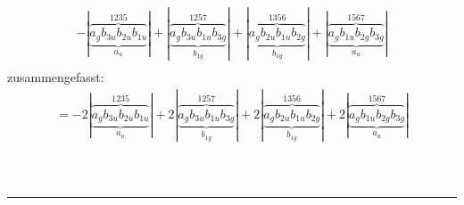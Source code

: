 \documentclass{article}
\begin{document}
\begin{multline*}
-\left|\underbrace{\overbrace{a_{g} b_{3u} b_{2u} b_{1u}}^{1 2 3 5}}_{a_{u}}\right|+\left|\underbrace{\overbrace{a_{g} b_{3u} b_{1u} b_{3g}}^{1 2 5 7}}_{b_{1g}}\right|+\left|\underbrace{\overbrace{a_{g} b_{2u} b_{1u} b_{2g}}^{1 3 5 6}}_{b_{1g}}\right|+\left|\underbrace{\overbrace{a_{g} b_{1u} b_{2g} b_{3g}}^{1 5 6 7}}_{a_{u}}\right|\\
\end{multline*}zusammengefasst:\begin{multline*}
=-2\left|\underbrace{\overbrace{a_{g} b_{3u} b_{2u} b_{1u}}^{1 2 3 5}}_{a_{u}}\right|+2\left|\underbrace{\overbrace{a_{g} b_{3u} b_{1u} b_{3g}}^{1 2 5 7}}_{b_{1g}}\right|+2\left|\underbrace{\overbrace{a_{g} b_{2u} b_{1u} b_{2g}}^{1 3 5 6}}_{b_{1g}}\right|+2\left|\underbrace{\overbrace{a_{g} b_{1u} b_{2g} b_{3g}}^{1 5 6 7}}_{a_{u}}\right|\\
\end{multline*}\\ \\
\hrule\newpage 
\end{document}
